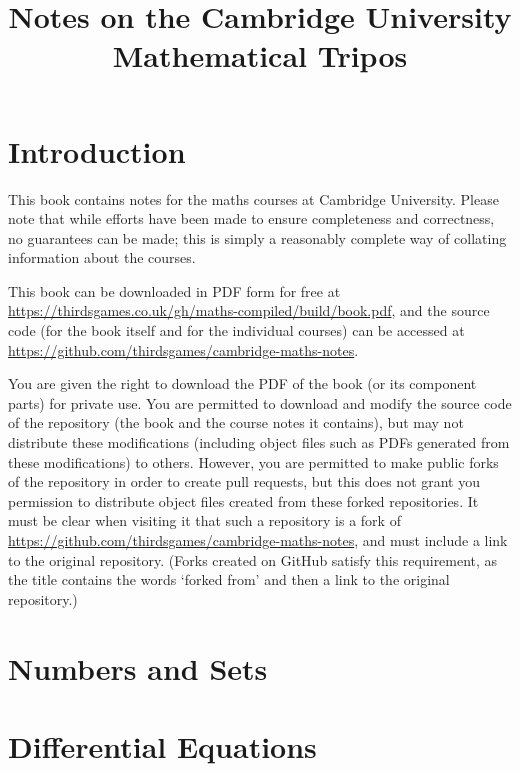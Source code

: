 \documentclass{book}
\title{Notes on the Cambridge University Mathematical Tripos}
\author{}
\begin{document}
\maketitle

\tableofcontents
\newpage

\chapter*{Introduction}
This book contains notes for the maths courses at Cambridge University. Please note that while efforts have been made to ensure completeness and correctness, no guarantees can be made; this is simply a reasonably complete way of collating information about the courses.

This book can be downloaded in PDF form for free at \url{https://thirdsgames.co.uk/gh/maths-compiled/build/book.pdf}, and the source code (for the book itself and for the individual courses) can be accessed at \url{https://github.com/thirdsgames/cambridge-maths-notes}.

You are given the right to download the PDF of the book (or its component parts) for private use. You are permitted to download and modify the source code of the repository (the book and the course notes it contains), but may not distribute these modifications (including object files such as PDFs generated from these modifications) to others. However, you are permitted to make public forks of the repository in order to create pull requests, but this does not grant you permission to distribute object files created from these forked repositories. It must be clear when visiting it that such a repository is a fork of \url{https://github.com/thirdsgames/cambridge-maths-notes}, and must include a link to the original repository. (Forks created on GitHub satisfy this requirement, as the title contains the words `forked from' and then a link to the original repository.)

\let\maketitle\ignorespaces
\renewcommand{\tableofcontentsnewpage}{}

\chapter{Numbers and Sets}

\chapter{Differential Equations}

\end{document}

